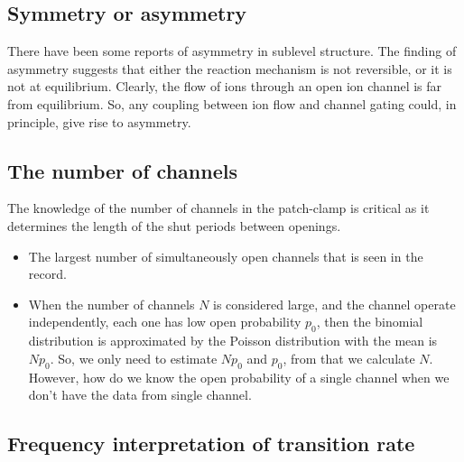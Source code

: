 \subsection{Symmetry or asymmetry}
\label{sec:symm-or-assymm}

There have been some reports of asymmetry in sublevel structure. The
finding of asymmetry suggests that either the reaction mechanism is
not reversible, or it is not at equilibrium. Clearly, the flow of ions
through an open ion channel is far from equilibrium. So, any coupling
between ion flow and channel gating could, in principle, give rise to
asymmetry.

\subsection{The number of channels}
\label{sec:number-channels}

The knowledge of the number of channels in the patch-clamp is
critical as it determines the length of the shut periods between
openings.
\begin{itemize}
\item The largest number of simultaneously open channels that is seen
  in the record.
\item When the number of channels $N$ is considered large, and the
  channel operate independently, each one has low open probability
  $p_0$, then the binomial distribution is approximated by the Poisson
  distribution with the mean is $Np_0$. So, we only need to estimate
  $Np_0$ and $p_0$, from that we calculate $N$. However, how do we
  know the open probability of a single channel when we don't have the
  data from single channel.
\end{itemize}


\subsection{Frequency interpretation of transition rate}
\label{sec:freq-interpr-trans}


